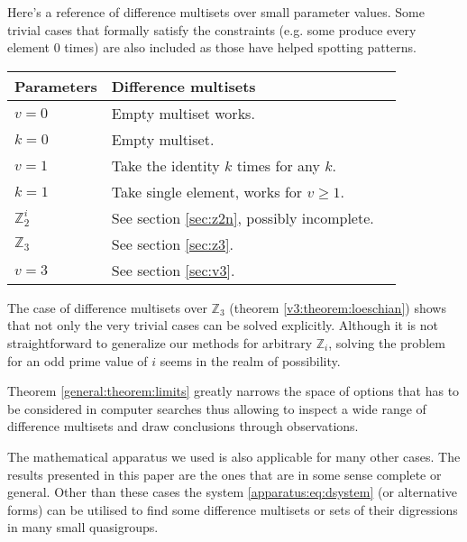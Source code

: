 Here's a reference of difference multisets over small parameter values. Some trivial cases that formally satisfy the constraints (e.g. some produce every element 0 times) are also included as those have helped spotting patterns.

\begin{tabular}{llr}
\toprule
    Parameters & Difference multisets \\
\midrule
    $v = 0$ & Empty multiset works. \\
    $k = 0$ & Empty multiset. \\
    $v = 1$ & Take the identity $k$ times for any $k$. \\
    $k = 1$ & Take single element, works for $v \geq 1$. \\
    $\mathbb Z_2^i$ & See section \ref{sec:z2n}, possibly incomplete. \\
    $\mathbb Z_3$ & See section \ref{sec:z3}. \\
    $v = 3$ & See section \ref{sec:v3}. \\    
\bottomrule
\end{tabular}


The case of difference multisets over $\mathbb Z_3$ (theorem \ref{v3:theorem:loeschian}) shows that not only the very trivial cases can be solved explicitly. Although it is not straightforward to generalize our methods for arbitrary $\mathbb Z_i$, solving the problem for an odd prime value of $i$ seems in the realm of possibility.

Theorem \ref{general:theorem:limits} greatly narrows the space of options that has to be considered in computer searches thus allowing to inspect a wide range of difference multisets and draw conclusions through observations.

The mathematical apparatus we used is also applicable for many other cases. The results presented in this paper are the ones that are in some sense complete or general. Other than these cases the system \eqref{apparatus:eq:dsystem} (or alternative forms) can be utilised to find some difference multisets or sets of their digressions in many small quasigroups. 
